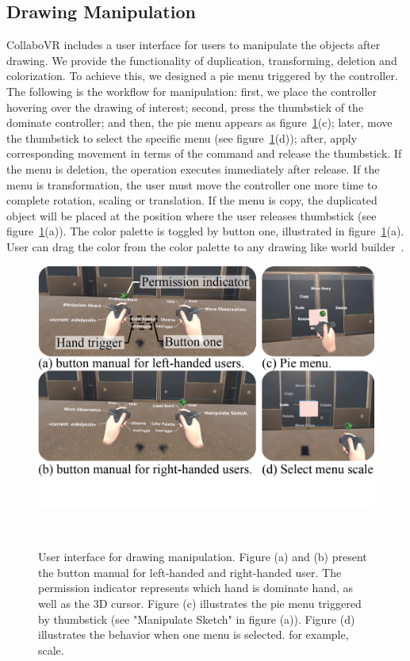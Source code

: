 \documentclass{sigchi}
\begin{document}
\subsection{Drawing Manipulation}
CollaboVR includes a user interface for users to manipulate the objects after drawing. We provide the functionality of duplication, transforming, deletion and colorization. To achieve this, we designed a pie menu triggered by the controller. The following is the workflow for manipulation: first, we place the controller hovering over the drawing of interest; second, press the thumbstick of the dominate controller; and then, the pie menu appears as figure~\ref{fig:userinterface}(c); later, move the thumbstick to select the specific menu (see figure~\ref{fig:userinterface}(d)); after, apply corresponding movement in terms of the command and release the thumbstick. If the menu is deletion, the operation executes immediately after release. If the menu is transformation, the user must move the controller one more time to complete rotation, scaling or translation. If the menu is copy, the duplicated object will be placed at the position where the user releases thumbstick (see figure~\ref{fig:userinterface}(a)). The color palette is toggled by button one, illustrated in figure~\ref{fig:userinterface}(a). User can drag the color from the color palette to any drawing like world builder~\cite{worldbuilder}.

\begin{figure}[b!]
 \centering
 \includegraphics[width=0.95\columnwidth]{Figure6.png}
 \caption{User interface for drawing manipulation. Figure (a) and (b) present the button manual for left-handed and right-handed user. The permission indicator represents which hand is dominate hand, as well as the 3D cursor. Figure (c) illustrates the pie menu triggered by thumbstick (see "Manipulate Sketch" in figure (a)). Figure (d) illustrates the behavior when one menu is selected. for example, scale.
 }~\label{fig:userinterface}
\end{figure}
\end{document}
